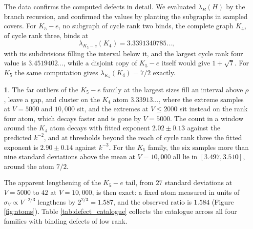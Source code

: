 \documentclass[12pt,oneside,english]{amsart}
\numberwithin{equation}{section}
\numberwithin{figure}{section}
\numberwithin{table}{section}
\theoremstyle{plain}
\numberwithin{thm}{section}
\theoremstyle{plain}
\theoremstyle{plain}
\theoremstyle{plain}
\theoremstyle{definition}
\theoremstyle{definition}
\newtheorem{numresult}[thm]{\protect\numresultname}
\theoremstyle{definition}
\theoremstyle{remark}
\providecommand{\numresultname}{Numerical Result}
\begin{document}
The data confirms the computed defects in detail. We evaluated $\lambda_{B}(H)$
by the branch recursion, and confirmed the values by planting the
subgraphs in sampled covers. For $K_{5}-e$, no subgraph of cycle
rank two binds, the complete graph $K_{4}$, of cycle rank three,
binds at
\[
\lambda_{K_{5}-e}\left(K_{4}\right)=3.3391340785\dots,
\]
with its subdivisions filling the interval below it, and the largest
cycle rank four value is $3.4519402\dots$, while a disjoint copy of
$K_{5}-e$ itself would give $1+\sqrt{7}$. For $K_{5}$ the same computation
gives $\lambda_{K_{5}}(K_{4})=7/2$ exactly.
\begin{numresult}
\label{nr:defects}The far outliers of the $K_{5}-e$ family at the
largest sizes fill an interval above $\rho$, leave a gap, and cluster
on the $K_{4}$ atom $3.33913\dots$, where the extreme samples at
$V=5000$ and $10{,}000$ sit, and the extremes at $V\leq2000$ sit
instead on the rank four atom, which decays faster and is gone by
$V=5000$. The count in a window around the $K_{4}$ atom decays with
fitted exponent $2.02\pm0.13$ against the predicted $k^{-2}$, and
at thresholds beyond the reach of cycle rank three the fitted exponent
is $2.90\pm0.14$ against $k^{-3}$. For the $K_{5}$ family, the six
samples more than nine standard deviations above the mean at $V=10{,}000$
all lie in $[3.497,3.510]$, around the atom $7/2$.
\end{numresult}
The apparent lengthening of the $K_{5}-e$ tail, from $27$ standard
deviations at $V=5000$ to $42$ at $V=10{,}000$, is then exact: a
fixed atom measured in units of $\sigma_{V}\propto V^{-2/3}$ lengthens
by $2^{2/3}=1.587$, and the observed ratio is $1.584$ (Figure \ref{fig:atoms}).
Table \ref{tab:defect_catalogue} collects the catalogue across all
four families with binding defects of low rank.
\end{document}

